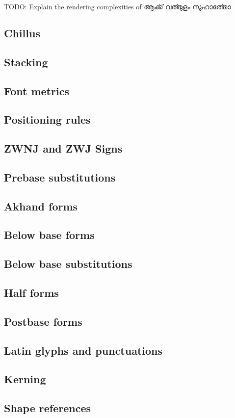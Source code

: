 TODO: Explain the rendering complexities of {\meera ആൎക്ക്  വൎത്തുളം  സുഹാൎത്തോ}

\subsection {Chillus}
\subsection {Stacking}
\subsection {Font metrics}
\subsection {Positioning rules}
\subsection {ZWNJ and ZWJ Signs}
\subsection {Prebase substitutions}
\subsection {Akhand forms}
\subsection {Below base forms}
\subsection {Below base substitutions}
\subsection {Half forms}
\subsection {Postbase forms}
\subsection {Latin glyphs and punctuations}
\subsection {Kerning}
\subsection {Shape references}
